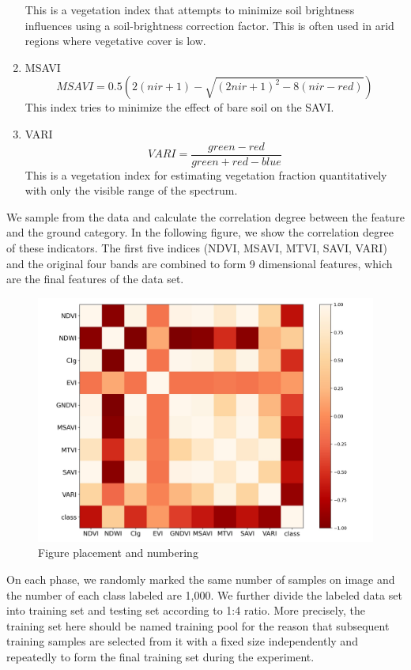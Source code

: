 \documentclass{isprs} %
\begin{document}
\begin{enumerate}
	This is a vegetation index that attempts to minimize soil brightness influences using a soil-brightness correction factor. This is often used in arid regions where vegetative cover is low.
	\item MSAVI
	\begin{equation}
		MSAVI=0.5(2(nir+1)-\sqrt{(2nir+1)^2-8(nir-red)})
	\end{equation}
	This index tries to minimize the effect of bare soil on the SAVI. 
	\item VARI
	\begin{equation}
		VARI=\frac{green-red}{green+red-blue}
	\end{equation}
	This is a vegetation index for estimating vegetation fraction quantitatively with only the visible range of the spectrum.
\end{enumerate}

We sample from the data and calculate the correlation degree between the feature and the ground category. In the following figure, we show the correlation degree of these indicators. The first five indices (NDVI, MSAVI, MTVI, SAVI, VARI) and the original four bands are combined to form 9 dimensional features, which are the final features of the data set.

\begin{figure}[ht!]
	\begin{center}
			\includegraphics[width=1.0\columnwidth]{figures/images/corr.jpg}
		\caption{Figure placement and numbering}
	\label{fig:studyArea}
	\end{center}
\end{figure}
On each phase, we randomly marked the same number of samples on image and the number of  each class labeled are 1,000. We further divide the labeled data set into training set and testing set according to 1:4 ratio. More precisely, the training set here should be named training pool for the reason that subsequent training samples are selected from it with a fixed size independently and repeatedly to form the final training set during the experiment.
\end{document}
